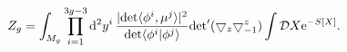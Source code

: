 \begin{equation}
Z_g = \int_{M_g}\prod_{i=1}^{3g-3} {\rm d}^2 y^i \, {|{\rm
det}\langle\phi^i, \mu^j\rangle |^2\over{\rm det}\langle\phi^i |
\phi^j\rangle } {\rm
det}'(\bigtriangledown_z\bigtriangledown^z_{-1})\int {\cal D}X
{\rm e}^{-S[X]} .
\end{equation}

